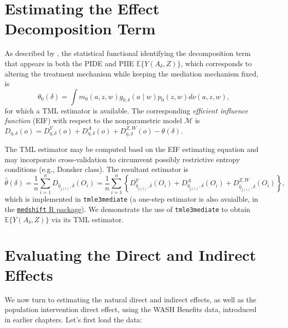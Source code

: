 \documentclass[
  12pt, krantz2,
]{krantz}
\newcommand{\passthrough}[1]{#1}
\theoremstyle{definition}
\theoremstyle{definition}
\theoremstyle{definition}
\newcommand{\1}{\mathbbm{1}}
\begin{document}
\hypertarget{estimating-the-effect-decomposition-term}{%
\section{Estimating the Effect Decomposition Term}\label{estimating-the-effect-decomposition-term}}

As described by \citet{diaz2020causal}, the statistical functional identifying the
decomposition term that appears in both the PIDE and PIIE
\(\mathbb{E}\{Y(A_{\delta}, Z)\}\), which corresponds to altering the treatment
mechanism while keeping the mediation mechanism fixed, is
\begin{equation*}
  \theta_0(\delta) = \int m_0(a, z, w) g_{0,\delta}(a \mid w) p_0(z, w)
    d\nu(a, z, w),
\end{equation*}
for which a TML estimator is available. The corresponding \emph{efficient influence
function} (EIF) with respect to the nonparametric model \(\mathcal{M}\) is
\(D_{\eta,\delta}(o) = D^Y_{\eta,\delta}(o) + D^A_{\eta,\delta}(o) + D^{Z,W}_{\eta,\delta}(o) - \theta(\delta)\).

The TML estimator may be computed basd on the EIF estimating equation and may
incorporate cross-validation \citep{zheng2011cross, chernozhukov2018double} to
circumvent possibly restrictive entropy conditions (e.g., Donsker class). The
resultant estimator is
\begin{equation*}
  \hat{\theta}(\delta) = \frac{1}{n} \sum_{i = 1}^n D_{\hat{\eta}_{j(i)},
  \delta}(O_i) = \frac{1}{n} \sum_{i = 1}^n \left\{ D^Y_{\hat{\eta}_{j(i)},
  \delta}(O_i) + D^A_{\hat{\eta}_{j(i)}, \delta}(O_i) +
  D^{Z,W}_{\hat{\eta}_{j(i)}, \delta}(O_i) \right\},
\end{equation*}
which is implemented in \passthrough{\lstinline!tmle3mediate!} (a one-step estimator is also avaialble,
in the \href{https://github.com/nhejazi/medshift}{\passthrough{\lstinline!medshift!} R package}). We
demonstrate the use of \passthrough{\lstinline!tmle3mediate!} to obtain \(\mathbb{E}\{Y(A_{\delta}, Z)\}\)
via its TML estimator.

\hypertarget{evaluating-the-direct-and-indirect-effects}{%
\section{Evaluating the Direct and Indirect Effects}\label{evaluating-the-direct-and-indirect-effects}}

We now turn to estimating the natural direct and indirect effects, as well as
the population intervention direct effect, using the WASH Benefits data,
introduced in earlier chapters. Let's first load the data:
\end{document}
